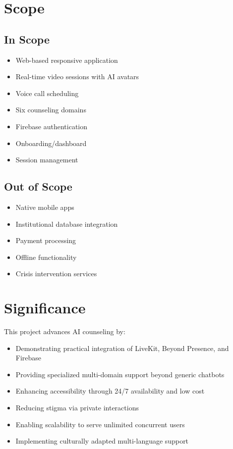 \documentclass[11pt,a4paper]{report}
\begin{document}
\section{Scope}

\subsection{In Scope}
\begin{itemize}
    \item Web-based responsive application
    \item Real-time video sessions with AI avatars
    \item Voice call scheduling
    \item Six counseling domains
    \item Firebase authentication
    \item Onboarding/dashboard
    \item Session management
\end{itemize}

\subsection{Out of Scope}
\begin{itemize}
    \item Native mobile apps
    \item Institutional database integration
    \item Payment processing
    \item Offline functionality
    \item Crisis intervention services
\end{itemize}

\section{Significance}
This project advances AI counseling by:
\begin{itemize}
    \item Demonstrating practical integration of LiveKit, Beyond Presence, and Firebase
    \item Providing specialized multi-domain support beyond generic chatbots
    \item Enhancing accessibility through 24/7 availability and low cost
    \item Reducing stigma via private interactions
    \item Enabling scalability to serve unlimited concurrent users
    \item Implementing culturally adapted multi-language support
\end{itemize}
\end{document}
